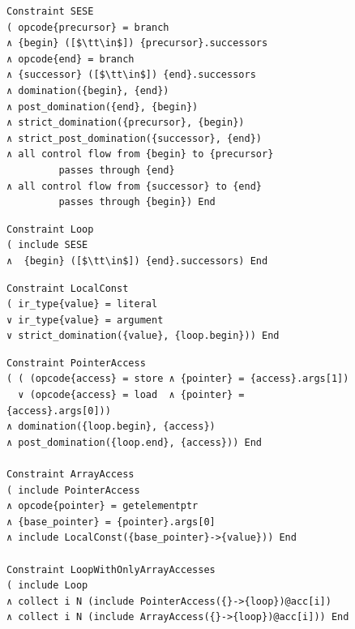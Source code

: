 \begin{figure}[p]
\begin{lstlisting}[language=CAnDL, label=CAnDLSESE, caption=
   {Single entry single exit region in CAnDL:
    The region spans from {\tt begin} to {\tt end}, with the entry as control
    flow {\tt precursor} to {\tt begin}, and the exit as control flow {\tt end}
    to {\tt successor}.\parfillskip=0pt}]
Constraint SESE
( opcode{precursor} = branch
∧ {begin} ([$\tt\in$]) {precursor}.successors
∧ opcode{end} = branch
∧ {successor} ([$\tt\in$]) {end}.successors
∧ domination({begin}, {end})
∧ post_domination({end}, {begin})
∧ strict_domination({precursor}, {begin})
∧ strict_post_domination({successor}, {end})
∧ all control flow from {begin} to {precursor}
         passes through {end}
∧ all control flow from {successor} to {end}
         passes through {begin}) End
\end{lstlisting}
\begin{lstlisting}[language=CAnDL, label=CAnDLLoop, caption=
   {Loops are defined in CAnDL as single entry single exit regions with a back
    edge.
    The back edge does not break the ``single exit'' condition, because it does
    not exit the region.\parfillskip=0pt}]
Constraint Loop
( include SESE
∧  {begin} ([$\tt\in$]) {end}.successors) End
\end{lstlisting}
\begin{lstlisting}[language=CAnDL, label=localconstant, caption=
   {This specification restricts {\tt value} to remain constant during the
    execution of a loop.
    It is underspecified on its own, and should be included in larger CAnDL
    programs that also include {\tt Loop}, renaming {\tt value} to the specific
    variable that needs to be constrained in this way. \parfillskip=0pt}]
Constraint LocalConst
( ir_type{value} = literal
∨ ir_type{value} = argument
∨ strict_domination({value}, {loop.begin})) End
\end{lstlisting}
\begin{lstlisting}[language=CAnDL, label={fig:arrayloop}, caption=
   {Building blocks are combined to restrict the permitted memory access within
    a loop. \leftskip=0pt\rightskip=0pt}]
Constraint PointerAccess
( ( (opcode{access} = store ∧ {pointer} = {access}.args[1])
  ∨ (opcode{access} = load  ∧ {pointer} = {access}.args[0]))
∧ domination({loop.begin}, {access})
∧ post_domination({loop.end}, {access})) End

Constraint ArrayAccess
( include PointerAccess
∧ opcode{pointer} = getelementptr
∧ {base_pointer} = {pointer}.args[0]
∧ include LocalConst({base_pointer}->{value})) End

Constraint LoopWithOnlyArrayAccesses
( include Loop
∧ collect i N (include PointerAccess({}->{loop})@acc[i])
∧ collect i N (include ArrayAccess({}->{loop})@acc[i])) End
\end{lstlisting}
\end{figure}


